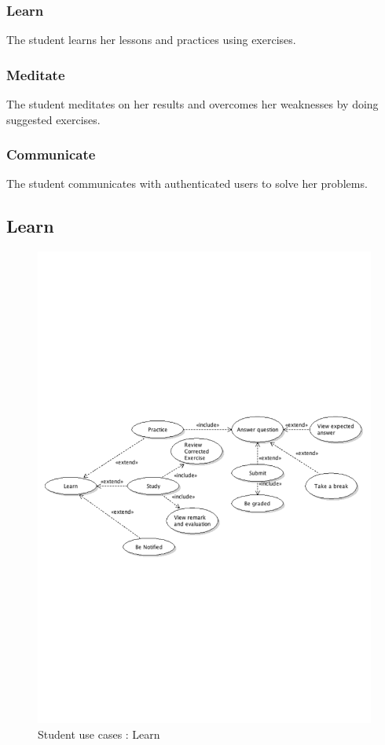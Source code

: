 		\subsubsection{Learn}
			The student learns her lessons and practices using exercises.
		\subsubsection{Meditate}
			The student meditates on her results and overcomes her weaknesses by doing suggested exercises.
		\subsubsection{Communicate}
			The student communicates with authenticated users to solve her problems.
\newpage
	\subsection{Learn}
		\begin{figure}[ht]
			\begin{center}
				\includegraphics[width=\textwidth,  trim=2cm 10cm 2cm 8cm]{UML_figure/use_cases/student/UC_Student_Learn.pdf}
				\caption{Student use cases : Learn}
			\end{center}
		\end{figure}
